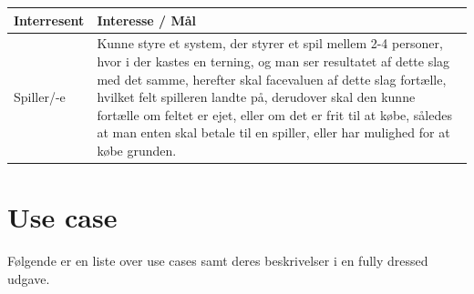     \begin{tabular}{ | l | p{13cm} |}
      
      \hline
    \textbf{Interresent} & \textbf{Interesse / Mål} \\ \hline
    Spiller/-e & Kunne styre et system, der styrer et spil mellem 2-4 personer, 
    hvor i der kastes en terning, og man ser resultatet af dette slag med det samme, herefter skal facevaluen af dette slag fortælle, hvilket felt spilleren landte på, derudover skal den kunne fortælle om feltet er ejet, eller om det er frit til at købe, således at man enten skal betale til en spiller, eller har mulighed for at købe grunden.
    \\ 
    \hline
      
    \hline
    \end{tabular}


\newpage

\section{Use case}

Følgende er en liste over use cases samt deres beskrivelser i en fully dressed udgave.


